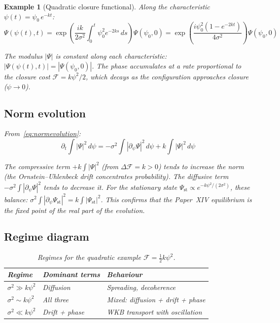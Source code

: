 \documentclass[12pt]{article}
\newtheorem{example}[theorem]{Example}
\newcommand{\Fcal}{\mathcal{F}}
\begin{document}
\begin{example}[Quadratic closure functional]
Along the characteristic $\psi(t) = \psi_0\, e^{-kt}$:
\begin{equation}
    \Psi(\psi(t), t) = \exp\!\left(\frac{ik}{2\sigma^2}\int_0^t \psi_0^2 e^{-2ks}\, ds\right)\Psi(\psi_0, 0)
    = \exp\!\left(\frac{i\psi_0^2(1-e^{-2kt})}{4\sigma^2}\right)\Psi(\psi_0, 0)
\end{equation}

The modulus $|\Psi|$ is constant along each characteristic: $|\Psi(\psi(t),t)| = |\Psi(\psi_0, 0)|$. The phase accumulates at a rate proportional to the closure cost $\Fcal = k\psi^2/2$, which decays as the configuration approaches closure ($\psi \to 0$).

\subsection*{Norm evolution}

From~\eqref{eq:normevolution}:
\begin{equation}
    \partial_t \int |\Psi|^2\, d\psi = -\sigma^2 \int |\partial_\psi\Psi|^2\, d\psi + k\int |\Psi|^2\, d\psi
\end{equation}

The compressive term $+k\int|\Psi|^2$ (from $\Delta\Fcal = k > 0$) tends to increase the norm (the Ornstein--Uhlenbeck drift concentrates probability). The diffusive term $-\sigma^2\int|\partial_\psi\Psi|^2$ tends to decrease it. For the stationary state $\Psi_{\mathrm{st}} \propto e^{-k\psi^2/(2\sigma^2)}$, these balance: $\sigma^2 \int |\partial_\psi\Psi_{\mathrm{st}}|^2 = k\int|\Psi_{\mathrm{st}}|^2$. This confirms that the Paper~XIV equilibrium is the fixed point of the real part of the evolution.

\subsection*{Regime diagram}

\begin{table}[ht]
\centering
\caption{Regimes for the quadratic example $\Fcal = \frac{1}{2}k\psi^2$.}
\label{tab:quadregimes}
\begin{tabular}{@{}lll@{}}
\toprule
Regime & Dominant terms & Behaviour \\
\midrule
$\sigma^2 \gg k\psi^2$ & Diffusion & Spreading, decoherence \\
$\sigma^2 \sim k\psi^2$ & All three & Mixed: diffusion + drift + phase \\
$\sigma^2 \ll k\psi^2$ & Drift + phase & WKB transport with oscillation \\
\bottomrule
\end{tabular}
\end{table}

\end{example}
\end{document}
